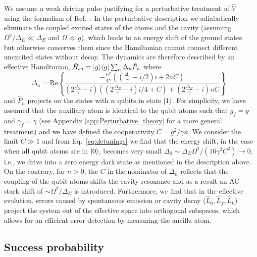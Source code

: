 We assume a weak driving pulse justifying for a perturbative treatment of
$\hat{V}$ using the formalism of Ref.~\cite{Florentin}. In the perturbative
description we adiabatically eliminate the coupled excited states of the atoms
and the cavity (assuming $\Omega^{2}/\Delta_{E}\!\ll\!\Delta_{E}$ and
$\Omega\!\ll\!g$), which leads to an energy shift of the ground states but
otherwise conserves them since the Hamiltonian cannot connect different
unexcited states without decay. The dynamics are therefore described by an
effective Hamiltonian,
$\hat{H}_{\mbox{\tiny eff}}=| g \rangle\langle g |\sum_{n}\Delta_{n}\hat{P}_{n}$ where
\begin{equation}
\Delta_{n}=
\mathrm{Re}\left\{\frac{-\frac{\Omega^{2}}{4\gamma}
((\frac{\Delta_{e}}{\gamma}\!\!-\!\!i/2)i\!\!+\!\!2nC)}
{(2\frac{\Delta_{e}}{\gamma}\!\!-\!\!i)((2\frac{\Delta_{E}}{\gamma}
\!\!-\!\!i)i/4\!\!+\!\!C)\!\!+\!\!(2\frac{\Delta_{E}}{\gamma}\!\!-\!\!i)
nC}\right\}\label{eq:detunings}
\end{equation} 
and $\hat{P}_{n}$ projects on the states with $n$ qubits in state $| 1 \rangle$. For
simplicity, we have assumed that the auxiliary atom is identical to the qubit
atoms such that $g_{f}=g$ and $\gamma_{f}=\gamma$ (see Appendix
\ref{app:Perturbative_theory} for a more general treatment) and we have defined
the cooperativity $C=g^{2}/\gamma\kappa$.
We consider the limit $C\gg1$ and from Eq.~\eqref{eq:detunings} we find that the
energy shift, in the case when all qubit atoms are in $| 0 \rangle$, becomes very
small $\Delta_{0}\sim\Delta_{E}\Omega^{2}/(16\gamma^{2} C^{2})\rightarrow 0$,
i.e., we drive into a zero energy dark state as mentioned in the description
above.
On the contrary, for $n>0$, the $C$ in the nominator of $\Delta_{n}$ reflects
that the coupling of the qubit atoms shifts the cavity resonance and as a result
an AC stark shift of $\sim\Omega^{2}/\Delta_{E}$ is introduced.
Furthermore, we find that in the effective evolution, errors caused by
spontaneous emission or cavity decay ($\hat{L}_{0},\hat{L}_{f},\hat{L}_{k}$)
project the system out of the effective space into orthogonal subspaces, which
allows for an efficient error detection by measuring the ancilla atom.

\subsection{Success probability}

